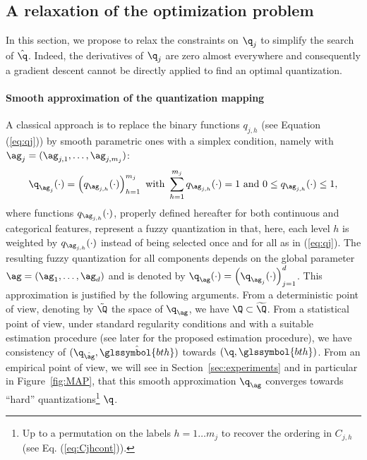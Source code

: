 \subsection{A relaxation of the optimization problem}

In this section, we propose to relax the constraints on $\q_j$ to simplify the search of $\hat{\q}$. Indeed, the derivatives of $\q_j$ are zero almost everywhere and consequently a gradient descent cannot be directly applied to find an optimal quantization.

\paragraph{Smooth approximation of the quantization mapping}

A classical approach is to replace the binary functions $q_{j,h}$ (see Equation (\ref{eq:qj}))  by smooth parametric ones  with a simplex condition, namely with $\ag_j=(\ag_{j,1},\ldots, \ag_{j,m_j})$:
\begin{equation*}
    {\q_{\ag_j}(\cdot)=\left(q_{\ag_{j,h}}(\cdot)\right)_{h=1}^{m_j} \text{ with } \sum_{h=1}^{m_j}q_{\ag_{j,h}}(\cdot)=1 \text{ and } 0 \leq q_{\ag_{j,h}}(\cdot) \leq 1,}
\end{equation*}
where functions $q_{\ag_{j,h}}(\cdot)$, properly defined hereafter for both continuous and categorical features, represent a fuzzy quantization in that, here, each level $h$ is weighted by $q_{\ag_{j,h}}(\cdot)$ instead of being selected once and for all as in (\ref{eq:qj}). The resulting fuzzy quantization for all components depends on the global parameter $\ag = (\ag_1, \ldots, \ag_d)$ and is denoted by $\q_{\ag}(\cdot)=\left(\q_{\ag_j}(\cdot)\right)_{j=1}^d$. This approximation is justified by the following arguments. From a deterministic point of view, denoting by $\tilde{\Q}$ the space of $\q_{\ag}$, we have $\Q \subset \widetilde{\Q}$. From a statistical point of view, under standard regularity conditions and with a suitable estimation procedure (see later for the proposed estimation procedure), we have consistency of $(\q_{\hat{\ag}}, \hat{\glssymbol{bth}})$ towards $(\q,\glssymbol{bth})$. From an empirical point of view, we will see in Section~\ref{sec:experiments} and in particular in Figure~\ref{fig:MAP}, that this smooth approximation $\q_{\ag}$ converges towards ``hard'' quantizations\footnote{Up to a permutation on the labels $h=1 \ldots m_j$ to recover the ordering in $C_{j,h}$ (see Eq. (\ref{eq:Cjhcont})).} $\q$.




